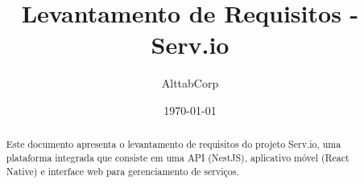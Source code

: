 \documentclass[12pt,a4paper]{article}
\title{Levantamento de Requisitos - Serv.io}
\author{AlttabCorp}
\date{\today}
\begin{document}
\maketitle

\begin{abstract}
Este documento apresenta o levantamento de requisitos do projeto Serv.io, uma plataforma integrada que consiste em uma API (NestJS), aplicativo móvel (React Native) e interface web para gerenciamento de serviços.
\end{abstract}

\pagebreak[4]

\tableofcontents

\pagebreak[4]










\end{document}
